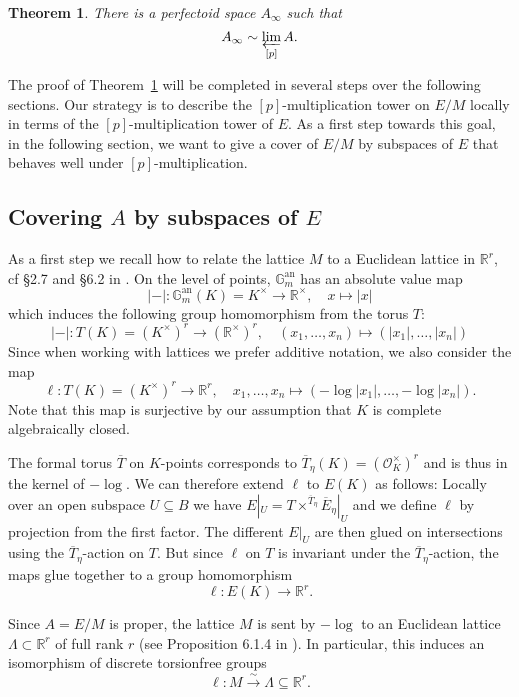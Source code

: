 \documentclass[11pt,oneside]{amsart}
\newtheorem{theorem}{Theorem}[section]
\theoremstyle{definition}
\theoremstyle{remark}
\begin{document}
	\begin{framed}
	\begin{theorem}\label{main theorem}
		There is a perfectoid space $A_\infty$ such that
				\[A_\infty \sim \varprojlim_{[p]} A.\]
	\end{theorem}
	\end{framed}
	
	The proof of Theorem~\ref{main theorem} will be completed in several steps over the following sections. Our strategy is to describe the $[p]$-multiplication tower on $E/M$ locally in terms of the $[p]$-multiplication tower of $E$.
	As a first step towards this goal, in the following section, we want to give a cover of $E/M$ by subspaces of $E$ that behaves well under $[p]$-multiplication.
	
	\subsection{Covering $A$ by subspaces of $E$}
	As a first step we recall how to relate the lattice $M$ to a Euclidean lattice in $\mathbb R^r$, cf \S2.7 and \S6.2 in  \cite{rigid geometry of curves}. On the level of points, $\mathbb{G}_m^{\operatorname{an}}$ has an absolute value map
	\[|-|:\mathbb{G}_m^{\operatorname{an}}(K)=K^\times\rightarrow \mathbb R^\times, \quad x\mapsto |x|\]
	which induces the following group homomorphism from the torus $T$:
	\[|-|:T(K)=(K^\times)^r\rightarrow (\mathbb R^\times)^r, \quad (x_1,\dots,x_n)\mapsto (|x_1|,\dots,|x_n|)\]
	Since when working with lattices we prefer additive notation, we also consider the map
	\[\ell:T(K)=(K^\times)^r\rightarrow \mathbb R^r, \quad x_1,\dots,x_n\mapsto (-\log |x_1|,\dots,-\log |x_n|).\]
	Note that this map is surjective by our assumption that $K$ is complete algebraically closed.
	
		The formal torus $\overline{T}$ on $K$-points corresponds to $\overline{T}_\eta(K) = (\mathcal O_K^\times)^r$ and is thus in the kernel of $-\log$. We can therefore extend $\ell$ to $E(K)$ as follows: Locally over an open subspace $U\subseteq B$ we have $E|_U = T\times^{\overline{T}_\eta}\overline{E}_\eta|_{U}$ and we define $\ell$ by projection from the first factor. The different $E|_U$ are then glued on intersections using the $\overline{T}_\eta$-action on $T$. But since $\ell$ on $T$ is invariant under the $\overline{T}_\eta$-action, the maps glue together to a group homomorphism 
	\[\ell:E(K)\rightarrow \mathbb R^r.\]
	
	Since $A=E/M$ is proper, the lattice $M$ is sent by $-\log$ to an Euclidean lattice $\Lambda \subset \mathbb R^r$ of full rank $r$ (see Proposition 6.1.4 in \cite{rigid geometry of curves}). In particular, this induces an isomorphism of discrete torsionfree groups
	\[\ell:M\xrightarrow{\sim} \Lambda\subseteq\mathbb R^r.\]
	
\end{document}
